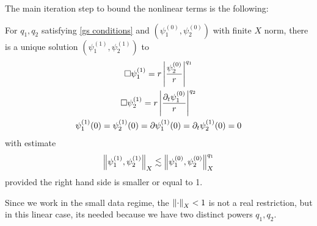 \documentclass[11pt, oneside]{amsart}
\begin{document}
	
The main iteration step to bound the nonlinear terms is the following:
	\begin{prop}\label{gs iteration}
		For $q_1,q_2$ satisfying \cref{gs conditions} and $(\psi_1^{(0)},\psi^{(0)}_2)$ with finite $X$ norm, there is a unique solution $(\psi_1^{(1)},\psi^{(1)}_2)$ to
		\begin{equation}\label{iterative equation}
			\begin{gathered}
				\Box\psi_1^{(1)}=r\left\lvert \frac{\psi^{(0)}_2}{r}\right\rvert^{q_1}\\
				\Box\psi^{(1)}_2=r\left\lvert \frac{\partial_t\psi^{(0)}_1}{r}\right\rvert^{q_2}\\
				\psi^{(1)}_1(0)=\psi^{(1)}_2(0)=\partial\psi^{(1)}_1(0)=\partial_t\psi^{(1)}_2(0)=0
			\end{gathered}
		\end{equation}
		with estimate
		\begin{equation*}
			\begin{gathered}
				\left\lVert \psi_1^{(1)},\psi_2^{(1)}\right\rVert_{X}\lesssim\left\lVert \psi_1^{(0)},\psi_2^{(0)}\right\rVert_X^{q_1}
			\end{gathered}
		\end{equation*}
		provided the right hand side is smaller or equal to 1.
	\end{prop}
	\begin{remark}
		Since we work in the small data regime, the $\left\lVert \cdot\right\rVert_X<1$ is not a real restriction, but in this linear case, its needed because we have two distinct powers $q_1,q_2$.
	\end{remark}
\end{document}
